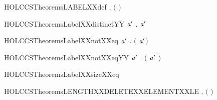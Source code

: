 \newcommand{\HOLCCSTheoremsLabelXXcaseXXeq}{\UseVerbatim{HOLCCSTheoremsLabelXXcaseXXeq}}
\begin{SaveVerbatim}{HOLCCSTheoremsLABELXXdef}
\HOLTokenTurnstile{} \HOLSymConst{\HOLTokenForall{}}.  \ensuremath{(} \ensuremath{)} \HOLSymConst{\ensuremath{=}} 
\end{SaveVerbatim}
\newcommand{\HOLCCSTheoremsLABELXXdef}{\UseVerbatim{HOLCCSTheoremsLABELXXdef}}
\begin{SaveVerbatim}{HOLCCSTheoremsLabelXXdistinctYY}
\HOLTokenTurnstile{} \HOLSymConst{\HOLTokenForall{}}\ensuremath{\HOLBoundVar{a}\sp{\prime{}}} .  \ensuremath{\HOLBoundVar{a}\sp{\prime{}}} \HOLSymConst{\HOLTokenNotEqual{}}  
\end{SaveVerbatim}
\newcommand{\HOLCCSTheoremsLabelXXdistinctYY}{\UseVerbatim{HOLCCSTheoremsLabelXXdistinctYY}}
\begin{SaveVerbatim}{HOLCCSTheoremsLabelXXnotXXeq}
\HOLTokenTurnstile{} \HOLSymConst{\HOLTokenForall{}}\ensuremath{\HOLBoundVar{a}\sp{\prime{}}} . \ensuremath{(}  \HOLSymConst{\ensuremath{=}}  \ensuremath{\HOLBoundVar{a}\sp{\prime{}}}\ensuremath{)} \HOLSymConst{\HOLTokenEquiv{}} 
\end{SaveVerbatim}
\newcommand{\HOLCCSTheoremsLabelXXnotXXeq}{\UseVerbatim{HOLCCSTheoremsLabelXXnotXXeq}}
\begin{SaveVerbatim}{HOLCCSTheoremsLabelXXnotXXeqYY}
\HOLTokenTurnstile{} \HOLSymConst{\HOLTokenForall{}}\ensuremath{\HOLBoundVar{a}\sp{\prime{}}} . \ensuremath{(} \ensuremath{\HOLBoundVar{a}\sp{\prime{}}} \HOLSymConst{\ensuremath{=}}  \ensuremath{)} \HOLSymConst{\HOLTokenEquiv{}} 
\end{SaveVerbatim}
\newcommand{\HOLCCSTheoremsLabelXXnotXXeqYY}{\UseVerbatim{HOLCCSTheoremsLabelXXnotXXeqYY}}
\begin{SaveVerbatim}{HOLCCSTheoremsLabelXXsizeXXeq}
\HOLTokenTurnstile{} 
\end{SaveVerbatim}
\newcommand{\HOLCCSTheoremsLabelXXsizeXXeq}{\UseVerbatim{HOLCCSTheoremsLabelXXsizeXXeq}}
\begin{SaveVerbatim}{HOLCCSTheoremsLENGTHXXDELETEXXELEMENTXXLE}
\HOLTokenTurnstile{} \HOLSymConst{\HOLTokenForall{}} .    \HOLSymConst{\HOLTokenImp{}}  \ensuremath{(}  \ensuremath{)} \HOLSymConst{\HOLTokenLt{}}  
\end{SaveVerbatim}
